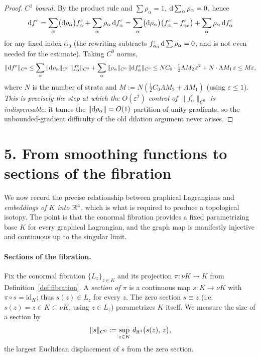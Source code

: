 \begin{proof}
\emph{$C^1$ bound.} By the product rule and $\sum\rho_\alpha=1$,
$\mathrm d\sum_\alpha\rho_\alpha=0$, hence
\[
\mathrm d f^\varepsilon=\sum_\alpha\bigl(\mathrm d\rho_\alpha\bigr)f_\alpha^\varepsilon
+\sum_\alpha\rho_\alpha\,\mathrm d f_\alpha^\varepsilon
=\sum_\alpha\bigl(\mathrm d\rho_\alpha\bigr)\bigl(f_\alpha^\varepsilon-f_{\alpha_0}^\varepsilon\bigr)
+\sum_\alpha\rho_\alpha\,\mathrm d f_\alpha^\varepsilon
\]
for any fixed index $\alpha_0$ (the rewriting subtracts
$f_{\alpha_0}^\varepsilon\,\mathrm d\sum\rho_\alpha=0$, and is not even needed for the
estimate). Taking $C^0$ norms,
\[
\|\mathrm d f^\varepsilon\|_{C^0}
\le\sum_\alpha\|\mathrm d\rho_\alpha\|_{C^0}\,\|f_\alpha^\varepsilon\|_{C^0}
+\sum_\alpha\|\rho_\alpha\|_{C^0}\,\|\mathrm d f_\alpha^\varepsilon\|_{C^0}
\le N C_0\cdot\tfrac12\Lambda M_2\,\varepsilon^2+N\cdot\Lambda M_1\,\varepsilon
\le M\varepsilon,
\]
where $N$ is the number of strata and $M:=N(\tfrac12 C_0\Lambda M_2+\Lambda M_1)$
(using $\varepsilon\le1$). \emph{This is precisely the step at which the
$O(\varepsilon^2)$ control of $\|f_\alpha^\varepsilon\|_{C^0}$ is indispensable:}
it tames the $\|\mathrm d\rho_\alpha\|=O(1)$ partition-of-unity gradients, so the
unbounded-gradient difficulty of the old dilation argument never arises.
\end{proof}


\section*{5. From smoothing functions to sections of the fibration}

We now record the precise relationship between graphical Lagrangians and
\emph{embeddings of $K$ into $\mathbb{R}^4$}, which is what is required to produce a
topological isotopy. The point is that the conormal fibration provides a fixed
parametrizing base $K$ for every graphical Lagrangian, and the graph map is
manifestly injective and continuous up to the singular limit.

\paragraph{Sections of the fibration.} Fix the conormal fibration $\{L_z\}_{z\in K}$
and its projection $\pi\colon\nu K\to K$ from
Definition~\ref{def:fibration}. A \emph{section of $\pi$} is a continuous map
$s\colon K\to\nu K$ with $\pi\circ s=\mathrm{id}_K$; thus $s(z)\in L_z$ for every
$z$. The zero section $s\equiv z$ (i.e.\ $s(z)=z\in K\subset\nu K$, using
$z\in L_z$) parametrizes $K$ itself. We measure the size of a section by
\[
\|s\|_{C^0}:=\sup_{z\in K}\,d_{\mathbb{R}^4}\bigl(s(z),\,z\bigr),
\]
the largest Euclidean displacement of $s$ from the zero section.

